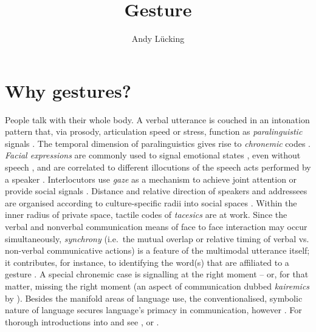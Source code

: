 \documentclass[output=paper
                ,modfonts
                ,nonflat
	        ,collection
	        ,collectionchapter
	        ,collectiontoclongg
 	        ,biblatex
                ,babelshorthands
                ,newtxmath
                ,draftmode
                ,colorlinks, citecolor=brown
]{./langsci/langscibook}
\author{Andy Lücking\affiliation{Universit\'{e} de Paris, Goethe-Universität Frankfurt}}
\title{Gesture}
\begin{document}
\maketitle
\label{chap-gesture}

\avmoptions{}

\section{Why gestures?} 
\label{sec:why-gestures}

People talk with their whole body. 
%
A verbal utterance is couched in an intonation pattern that, via prosody, articulation speed or stress, function as \emph{paralinguistic}  signals \citep[e.g.][]{Birdwhistell:1970}. 
%
The temporal dimension of paralinguistics gives rise to \emph{chronemic} codes  \citep{Poyatos:1975,Bruneau:1980}. \emph{Facial expressions}  are commonly used to signal emotional states  \citep{Ekman:Friesen:1978}, even without speech \citep{Argyle:1975}, and are correlated to different illocutions of the speech acts performed by a speaker \citep{Domaneschi:Passarelli:Chiorri:2017}.
%
Interlocutors use \emph{gaze}  as a mechanism to achieve joint attention \citep{Argyle:Cook:1976} or provide social signals \citep{Kendon:1967}. 
%
Distance and relative direction of speakers and addressees are organised according to culture-specific radii into social spaces  \citep[\emph{proxemics},][]{Hall:1968}. 
%
Within the inner radius of private space, tactile codes of \emph{tacesics}  \citep{Kauffman:1971} are at work. 
%
Since the verbal and nonverbal communication means of face to face interaction  may occur simultaneously, \emph{synchrony}  (i.e.\ the mutual overlap or relative timing of verbal vs. non-verbal communicative actions) is a feature of the multimodal utterance itself; it contributes, for instance, to identifying the word(s) that are affiliated to a gesture \citep{Wiltshire:2007}. 
%
A special chronemic case is signalling at the right moment -- or, for that matter, missing the right moment (an aspect of communication dubbed \emph{kairemics}  by \citealp[]{Luecking:Pfeiffer:2012}).
%
Besides the manifold areas of language use, the conventionalised, symbolic nature of language secures language's primacy in communication, however \citep{de:Ruiter:2004}.
%
For thorough introductions into  and  see \citet{Noeth:1990}, \citet{Posner:Robering:Sebeok:1997:2004} or \citet{Mueller:Cienki:Fricke:Ladewig:McNeill:Tessendorf:2013:2014}.
\end{document}
